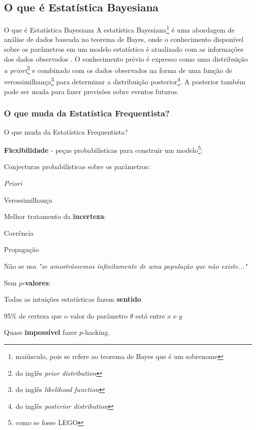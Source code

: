 \subsection{O que é Estatística Bayesiana}
\begin{frame}{O que é Estatística Bayesiana}
	A estatística Bayesiana\footnote{maiúsculo, pois se refere ao teorema de Bayes que é um sobrenome}
	é uma abordagem de análise de dados baseada no teorema de Bayes,
	onde o conhecimento disponível sobre os parâmetros em um modelo estatístico
	é atualizado com as informações dos dados observados
	\parencite{gelman2013bayesian}. O conhecimento prévio é expresso como
	uma distribuição
	\textit{a priori}\footnote{do inglês \foreignlanguage{english}{\textit{prior distribution}}}
	e combinado com os dados observados na forma de uma função de
	verossimilhança\footnote{do inglês \foreignlanguage{english}{\textit{likelihood function}}}
	para determinar a distribuição
	posterior\footnote{\foreignlanguage{english}{do inglês \textit{posterior distribution}}}.
	A posterior também pode ser usada para fazer previsões sobre eventos futuros.
\end{frame}

\subsubsection{O que muda da Estatística Frequentista?}
\begin{frame}{O que muda da Estatística Frequentista?}
	\begin{vfilleditems}
		\item \textbf{Flexibilidade} - peças probabilísticas para construir um modelo\footnote{como se fosse LEGO}:
		\begin{vfilleditems}
			\item Conjecturas probabilísticas sobre os parâmetros:
			\begin{vfilleditems}
				\item \textit{Priori}
				\item Verossimilhança
			\end{vfilleditems}
		\end{vfilleditems}
		\item Melhor tratamento da \textbf{incerteza}:
		\begin{vfilleditems}
			\item Coerência
			\item Propagação
			\item Não se usa \textit{"se amostrássemos infinitamente de uma população que não existe..."}
		\end{vfilleditems}
		\item Sem \textbf{$p$-valores}:
		\begin{vfilleditems}
			\item Todas as intuições estatísticas fazem \textbf{sentido}
			\item 95\% de certeza que o valor do parâmetro $\theta$ está entre $x$ e $y$
			\item Quase \textbf{impossível} fazer $p$-hacking.
		\end{vfilleditems}
	\end{vfilleditems}
\end{frame}

